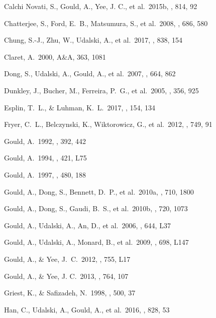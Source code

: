 \documentclass[10pt]{emulateapj}
\begin{document}
\begin{thebibliography}{999}
Calchi Novati, S., Gould, A., Yee, J. C., et al.\ 2015b, \apj, 814, 92

Chatterjee, S., Ford, E.~B., Matsumura, S., et al.\ 2008, \apj, 686, 580 

Chung, S.-J., Zhu, W., Udalski, A., et al.\ 2017, \apj, 838, 154 

Claret, A.\ 2000, A\&A, 363, 1081

Dong, S., Udalski, A., Gould, A., et al.\ 2007, \apj, 664, 862 

Dunkley, J., Bucher, M., Ferreira, P.~G., et al.\ 2005, \mnras, 356, 925 

Esplin, T.~L., \& Luhman, K.~L.\ 2017, \aj, 154, 134 

Fryer, C.~L., Belczynski, K., Wiktorowicz, G., et al.\ 2012, \apj, 749, 91 

Gould, A.\ 1992, \apj, 392, 442

Gould, A.\ 1994, \apjl, 421, L75 

Gould, A.\ 1997, \apj, 480, 188

Gould, A., Dong, S., Bennett, D.~P., et al.\ 2010a, \apj, 710, 1800 

Gould, A., Dong, S., Gaudi, B.~S., et al.\ 2010b, \apj, 720, 1073 

Gould, A., Udalski, A., An, D., et al.\ 2006, \apjl, 644, L37 

Gould, A., Udalski, A., Monard, B., et al.\ 2009, \apjl, 698, L147 

Gould, A., \& Yee, J.~C.\ 2012, \apjl, 755, L17 

Gould, A., \& Yee, J. C.\ 2013, \apj, 764, 107

Griest, K., \& Safizadeh, N.\ 1998, \apj, 500, 37

Han, C., Udalski, A., Gould, A., et al.\ 2016, \apj, 828, 53 


\end{thebibliography}
\end{document}
